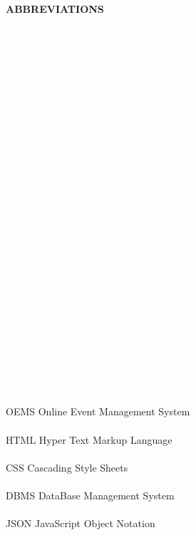 \begin{center}
\textbf{\LARGE{ABBREVIATIONS}}\\[1cm]

\end{center}
\normalsize

\\\\\\\\\\\\\\\\\\\\\\\\\\\\\\\\\


\\\\



\\\\\\\


\\\\


\begin{abbrv}
\hspace{-0.7cm} 
OEMS      \hspace{3.75cm} Online Event Management System\\\\
HTML     \hspace{3.9cm}Hyper Text Markup Language\\\\
CSS     \hspace{4.25cm} Cascading Style Sheets\\\\
DBMS     \hspace{3.8cm} DataBase Management System\\\\
JSON     \hspace{3.95cm} JavaScript Object Notation\\\\
\end{abbrv}
